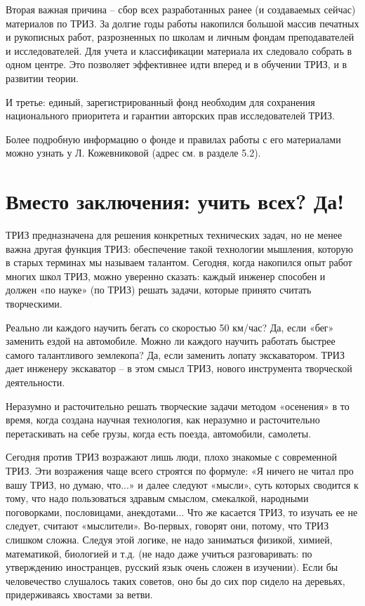 \documentclass[11pt,a4paper]{article}
\begin{document}
Вторая важная причина -- сбор всех разработанных ранее (и создаваемых сейчас)
материалов по ТРИЗ. За долгие годы работы накопился большой массив печатных и
рукописных работ, разрозненных по школам и личным фондам преподавателей и
исследователей. Для учета и классификации материала их следовало собрать в
одном центре. Это позволяет эффективнее идти вперед и в обучении ТРИЗ, и в
развитии теории.

И третье: единый, зарегистрированный фонд необходим для сохранения
национального приоритета и гарантии авторских прав исследователей ТРИЗ.

Более подробную информацию о фонде и правилах работы с его материалами можно
узнать у Л. Кожевниковой (адрес см. в разделе 5.2).

\section{Вместо заключения: учить всех? Да!}

ТРИЗ предназначена для решения конкретных технических задач, но не менее важна
другая функция ТРИЗ: обеспечение такой технологии мышления, которую в старых
терминах мы называем талантом. Сегодня, когда накопился опыт работ многих школ
ТРИЗ, можно уверенно сказать: каждый инженер способен и должен «по науке» (по
ТРИЗ) решать задачи, которые принято считать творческими.

Реально ли каждого научить бегать со скоростью 50 км/час? Да, если «бег»
заменить ездой на автомобиле. Можно ли каждого научить работать быстрее самого
талантливого землекопа? Да, если заменить лопату экскаватором. ТРИЗ дает
инженеру экскаватор -- в этом смысл ТРИЗ, нового инструмента творческой
деятельности.

Неразумно и расточительно решать творческие задачи методом «осенения» в то
время, когда создана научная технология, как неразумно и расточительно
перетаскивать на себе грузы, когда есть поезда, автомобили, самолеты.

Сегодня против ТРИЗ возражают лишь люди, плохо знакомые с современной
ТРИЗ. Эти возражения чаще всего строятся по формуле: «Я ничего не читал про
вашу ТРИЗ, но думаю, что...» и далее следуют «мысли», суть которых сводится к
тому, что надо пользоваться здравым смыслом, смекалкой, народными поговорками,
пословицами, анекдотами... Что же касается ТРИЗ, то изучать ее не следует,
считают «мыслители». Во-первых, говорят они, потому, что ТРИЗ слишком сложна.
Следуя этой логике, не надо заниматься физикой, химией, математикой, биологией
и т.д. (не надо даже учиться разговаривать: по утверждению иностранцев,
русский язык очень сложен в изучении). Если бы человечество слушалось таких
советов, оно бы до сих пор сидело на деревьях, придерживаясь хвостами за
ветви.
\end{document}
